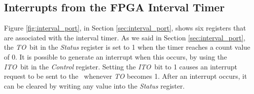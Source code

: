 \subsection{Interrupts from the FPGA Interval Timer}

Figure \ref{fig:interval_port}, in Section \ref{sec:interval_port}, shows six registers that
are associated with the interval timer. As we said in Section \ref{sec:interval_port}, the
{\it TO}~bit in the {\it Status} register is set to 1 when the timer reaches a count value of 0.
It is possible to generate an interrupt when this occurs, by using the {\it ITO}~bit in 
the {\it Control} register. Setting the {\it ITO}~bit to 1 causes an interrupt request to 
be sent to the \GIC~whenever {\it TO} becomes 1. After an interrupt occurs, it can be cleared 
by writing any value into the {\it Status} register.



